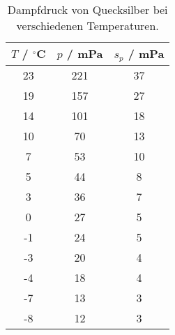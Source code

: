 \begin{table}[H]
\caption{Dampfdruck von Quecksilber bei verschiedenen Temperaturen.}
\begin{center}
\begin{tabular}{|c|c|c|}
  \hline
  $T$ / ${}^{\circ}$C & $p$ / mPa & $s_p$ / mPa \\ \hline
  23 & 221 & 37 \\ \hline
  19 & 157 & 27 \\ \hline
  14 & 101 & 18 \\ \hline
  10 & 70 & 13 \\ \hline
  7 & 53 & 10 \\ \hline
  5 & 44 & 8 \\ \hline
  3 & 36 & 7 \\ \hline
  0 & 27 & 5 \\ \hline
  -1 & 24 & 5 \\ \hline
  -3 & 20 & 4 \\ \hline
  -4 & 18 & 4 \\ \hline
  -7 & 13 & 3 \\ \hline
  -8 & 12 & 3 \\ \hline
\end{tabular}
\end{center}
\label{tab:pressure}
\end{table}
